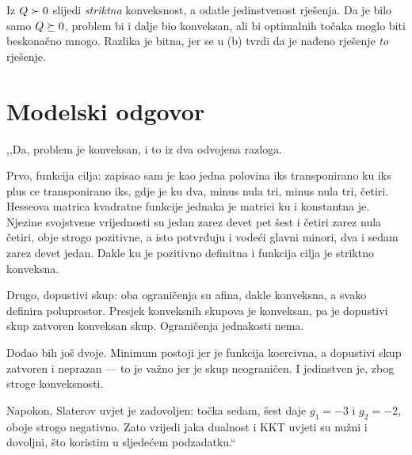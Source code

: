 \begin{zamka}
Iz $Q \succ 0$ slijedi \emph{striktna} konveksnost, a odatle jedinstvenost
rješenja. Da je bilo samo $Q \succeq 0$, problem bi i dalje bio konveksan, ali bi
optimalnih točaka moglo biti beskonačno mnogo. Razlika je bitna, jer se u (b)
tvrdi da je nađeno rješenje \emph{to} rješenje.
\end{zamka}

\section{Modelski odgovor}
\label{sec:z1a-odgovor}

\begin{izgovor}
,,Da, problem je konveksan, i to iz dva odvojena razloga.

Prvo, funkcija cilja: zapisao sam je kao jedna polovina iks transponirano ku iks
plus ce transponirano iks, gdje je ku dva, minus nula tri, minus nula tri,
četiri. Hesseova matrica kvadratne funkcije jednaka je matrici ku i konstantna
je. Njezine svojstvene vrijednosti su jedan zarez devet pet šest i četiri zarez
nula četiri, obje strogo pozitivne, a isto potvrđuju i vodeći glavni minori, dva
i sedam zarez devet jedan. Dakle ku je pozitivno definitna i funkcija cilja je
striktno konveksna.

Drugo, dopustivi skup: oba ograničenja su afina, dakle konveksna, a svako
definira poluprostor. Presjek konveksnih skupova je konveksan, pa je dopustivi
skup zatvoren konveksan skup. Ograničenja jednakosti nema.

Dodao bih još dvoje. Minimum postoji jer je funkcija koercivna, a dopustivi skup
zatvoren i neprazan --- to je važno jer je skup neograničen. I jedinstven je,
zbog stroge konveksnosti.

Napokon, Slaterov uvjet je zadovoljen: točka sedam, šest daje $g_1 = -3$ i
$g_2 = -2$, oboje strogo negativno. Zato vrijedi jaka dualnost i KKT uvjeti su
nužni i dovoljni, što koristim u sljedećem podzadatku.``
\end{izgovor}
